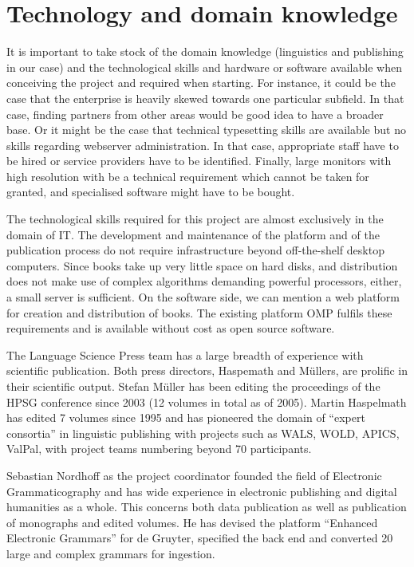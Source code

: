 \documentclass[nonflat,smallfont
]{langsci/langscibook}
\newcommand{\background}[1]{ 
  \vspace{5mm}
  \renewcommand{\tblslinecolour}{lsDarkBlue}
  \tblssy[red]{explore2}{Background}{\vspace*{-5mm}#1}
}
\newcommand{\langscisolution}[1]{
  \renewcommand{\tblslinecolour}{lsLightBlue}
  \tblssy{langsci}{LangSci solution}{\vspace*{-5mm}#1}
}
\renewcommand{\tblssy}[4][black!12]{%
  \renewcommand{\langscisymbol}{#2}\renewcommand{\tblsboxcolor}{#1}
  \begin{mdframed}[style=yellowexercise,frametitle={#3}]
    #4
  \end{mdframed}
}
\begin{document}
\newpage 
\section{Technology and domain knowledge}

\vspace*{2mm}\background{It is important to take stock of the domain knowledge (linguistics and publishing in our case) and the technological skills and hardware or software available when conceiving the project and required when starting. For instance, it could be the case that the enterprise is heavily skewed towards one particular subfield. In that case, finding partners from other areas would be good idea to have a broader base. Or it might be the case that technical typesetting skills are available but no skills regarding webserver administration. In that case, appropriate staff have to be hired or service providers have to be identified. Finally, large monitors with high resolution with be a technical requirement which cannot be taken for granted, and specialised software might have to be bought.}
\langscisolution{
The technological skills required for this project are almost exclusively in the domain of IT. The development and maintenance of the platform and of the publication process do not require infrastructure beyond off-the-shelf desktop computers. Since books take up very little space on hard disks, and distribution does not make use of complex algorithms demanding powerful processors, either, a small server is sufficient. 
On the software side, we can mention a web platform for creation and distribution of books. The existing platform OMP fulfils these requirements and is available without cost as open source software.

The Language Science Press team has a large breadth of experience with scientific publication. Both press directors, Haspemath and Müllers, are prolific in their scientific output. Stefan Müller has been editing the proceedings of the HPSG conference since 2003 (12 volumes in total as of 2005). Martin Haspelmath has edited 7 volumes since 1995 and has pioneered the domain of ``expert consortia'' in linguistic publishing with projects such as WALS, WOLD, APICS, ValPal, with project teams numbering beyond 70 participants. 

Sebastian Nordhoff as the project coordinator founded the field of Electronic Grammaticography and has wide experience in electronic publishing and digital humanities as a whole. This concerns both data publication as well as publication of monographs and edited volumes. He has devised the platform ``Enhanced Electronic Grammars'' for de Gruyter, specified the back end and converted 20 large and complex grammars for ingestion.
}
\end{document}
